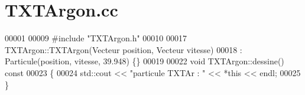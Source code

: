 \section{T\+X\+T\+Argon.\+cc}
\label{_t_x_t_argon_8cc_source}

\begin{DoxyCode}
00001 
00009 \textcolor{preprocessor}{#include "TXTArgon.h"}
00010 
00017 TXTArgon::TXTArgon(Vecteur position, Vecteur vitesse)
00018  : Particule(position, vitesse, 39.948) \{\}
00019 
00022 \textcolor{keywordtype}{void} TXTArgon::dessine()\textcolor{keyword}{ const}
00023 \textcolor{keyword}{}\{
00024     std::cout << \textcolor{stringliteral}{"particule TXTAr : "} << *\textcolor{keyword}{this} << endl;
00025 \}
\end{DoxyCode}
